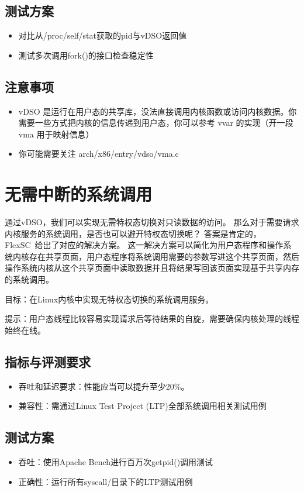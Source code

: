 \subsection*{测试方案}
\begin{itemize}
    \item 对比从/proc/self/stat获取的pid与vDSO返回值
    \item 测试多次调用fork()的接口检查稳定性
\end{itemize}

\subsection*{注意事项}
\begin{itemize}
    \item vDSO 是运行在用户态的共享库，没法直接调用内核函数或访问内核数据。你需要一些方式把内核的信息传递到用户态，你可以参考 vvar 的实现（开一段 vma 用于映射信息）
    \item 你可能需要关注 arch/x86/entry/vdso/vma.c
\end{itemize}

\section{无需中断的系统调用}
通过vDSO，我们可以实现无需特权态切换对只读数据的访问。
那么对于需要请求内核服务的系统调用，是否也可以避开特权态切换呢？
答案是肯定的，FlexSC~\cite{soares2010flexsc}给出了对应的解决方案。
这一解决方案可以简化为用户态程序和操作系统内核存在共享页面，用户态程序将系统调用需要的参数写进这个共享页面，然后操作系统内核从这个共享页面中读取数据并且将结果写回该页面实现基于共享内存的系统调用。

目标：在Linux内核中实现无特权态切换的系统调用服务。

提示：用户态线程比较容易实现请求后等待结果的自旋，需要确保内核处理的线程始终在线。

\subsection*{指标与评测要求}
\begin{itemize}
    \item 吞吐和延迟要求：性能应当可以提升至少20\%。
    \item 兼容性：需通过Linux Test Project (LTP)全部系统调用相关测试用例
\end{itemize}


\subsection*{测试方案}
\begin{itemize}
    \item 吞吐：使用Apache Bench进行百万次getpid()调用测试
    \item 正确性：运行所有syscall/目录下的LTP测试用例
\end{itemize}
